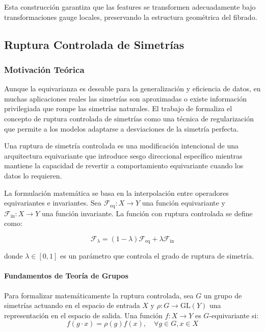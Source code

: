 Esta construcción garantiza que las features se transformen adecuadamente bajo transformaciones gauge locales, preservando la estructura geométrica del fibrado.

\subsection{Ruptura Controlada de Simetrías}

\subsubsection{Motivación Teórica}

Aunque la equivarianza es deseable para la generalización y eficiencia de datos, en muchas aplicaciones reales las simetrías son aproximadas o existe información privilegiada que rompe las simetrías naturales. El trabajo de \citet{vanderouderaa2024symmetry} formaliza el concepto de ruptura controlada de simetrías como una técnica de regularización que permite a los modelos adaptarse a desviaciones de la simetría perfecta.

\begin{definition}
Una ruptura de simetría controlada es una modificación intencional de una arquitectura equivariante que introduce sesgo direccional específico mientras mantiene la capacidad de revertir a comportamiento equivariante cuando los datos lo requieren.
\end{definition}

La formulación matemática se basa en la interpolación entre operadores equivariantes e invariantes. Sea $\mathcal{F}_{\text{eq}}: X \to Y$ una función equivariante y $\mathcal{F}_{\text{in}}: X \to Y$ una función invariante. La función con ruptura controlada se define como:

\begin{equation}
\mathcal{F}_\lambda = (1-\lambda) \mathcal{F}_{\text{eq}} + \lambda \mathcal{F}_{\text{in}}
\end{equation}

donde $\lambda \in [0,1]$ es un parámetro que controla el grado de ruptura de simetría.

\paragraph{Fundamentos de Teoría de Grupos}

Para formalizar matemáticamente la ruptura controlada, sea $G$ un grupo de simetrías actuando en el espacio de entrada $X$ y $\rho: G \to \text{GL}(Y)$ una representación en el espacio de salida. Una función $f: X \to Y$ es $G$-equivariante si:
\begin{equation}
f(g \cdot x) = \rho(g) f(x), \quad \forall g \in G, x \in X
\end{equation}

